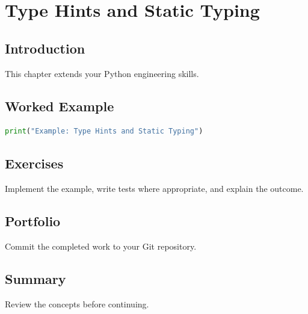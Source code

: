 \chapter{Type Hints and Static Typing}
\label{chap:vol3-21}



\section{Introduction}
This chapter extends your Python engineering skills.

\section{Worked Example}
\begin{lstlisting}[language=Python]
print("Example: Type Hints and Static Typing")
\end{lstlisting}

\section{Exercises}
\begin{exercise}
Implement the example, write tests where appropriate, and explain the outcome.
\end{exercise}

\section{Portfolio}
Commit the completed work to your Git repository.

\section{Summary}
Review the concepts before continuing.
